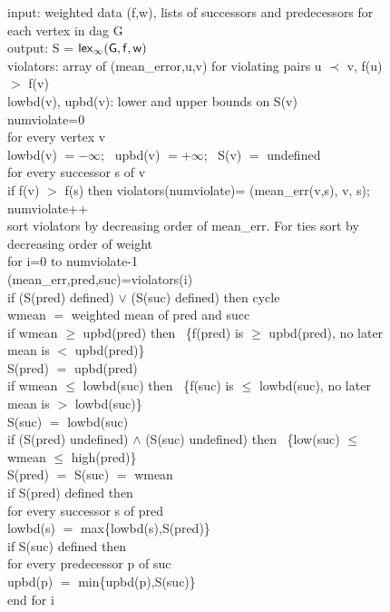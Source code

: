 \documentclass[11pt]{article}
\newcommand{\lex}[2]{\ensuremath{\mathsf{lex}_{#1} \ifthenelse{\equal{#2}{}}{}{(#2)}}}
\newlength{\Ainlength}
\newlength{\Aintemp}
\newcommand{\Ain}[1]{\setlength{\Aintemp}{0.5in}\addtolength{\Aintemp}{#1\Ainlength} \hspace*{\Aintemp}}
\begin{document}
\begin{figure}
{\sffamily \small
\Ain{0} input: weighted data (f,w), lists of successors and predecessors for each vertex in dag G\\
\Ain{0} output: S = \lex{\infty}{\mathsf{G,f,w}}\\
\Ain{0} violators: array of (mean\_error,u,v)  for violating pairs u $\prec$ v, f(u) $>$ f(v)\\
\Ain{0} lowbd(v), upbd(v): lower and upper bounds on S(v)\\

\Ain{0} numviolate=0\\
\Ain{0} for every vertex v\\
\Ain{1}   lowbd(v) $=-\infty$;~  upbd(v) $=+\infty$;~ S(v) $=$ undefined\\
\Ain{1}   for every successor s of v\\
\Ain{2}      if f(v) $>$ f(s) then violators(numviolate)= (mean\_err(v,s), v, s);~ numviolate++\\

\Ain{0} sort violators by decreasing order of mean\_err. For ties sort by decreasing order of weight\\


\Ain{0} for i=0 to numviolate-1\\
\Ain{1}   (mean\_err,pred,suc)=violators(i)\\
\Ain{1}   if (S(pred) defined) $\vee$ (S(suc) defined) then cycle\\
\Ain{1}   wmean $=$ weighted mean of pred and succ\\
\Ain{1}   if wmean $\geq$ upbd(pred) then~ \{f(pred) is $\geq$ upbd(pred), no later mean is $<$ upbd(pred)\}\\
\Ain{2}     S(pred) $=$ upbd(pred)\\
\Ain{1}   if wmean $\leq$ lowbd(suc) then~ \{f(suc) is $\leq$ lowbd(suc), no later mean is $>$ lowbd(suc)\}\\
\Ain{2}     S(suc) $=$ lowbd(suc)\\
\Ain{1}  if (S(pred) undefined) $\wedge$ (S(suc) undefined) then~ \{low(suc) $\leq$ wmean $\leq$ high(pred)\}\\
\Ain{2}    S(pred) $=$ S(suc) $=$ wmean\\

\Ain{1} if S(pred) defined then\\
\Ain{2}   for every successor s of pred\\
\Ain{3}      lowbd(s) $=$ max\{lowbd(s),S(pred)\}\\
\Ain{1} if S(suc) defined then\\
\Ain{2}    for every predecessor p of suc\\
\Ain{3}       upbd(p) $=$ min\{upbd(p),S(suc)\}\\
\Ain{0} end for i\\

}
\end{figure}
\end{document}
